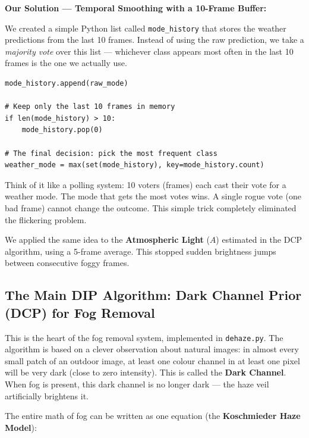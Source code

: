 \documentclass[12pt, a4paper]{article}
\begin{document}
\textbf{Our Solution — Temporal Smoothing with a 10-Frame Buffer:}

We created a simple Python list called \texttt{mode\_history} that stores the
weather predictions from the last 10 frames. Instead of using the raw prediction,
we take a \textit{majority vote} over this list — whichever class appears most
often in the last 10 frames is the one we actually use.

\begin{tcolorbox}[
  colback=blue!5!white,
  colframe=blue!50!black,
  title={\textbf{Temporal Smoothing Logic (main.py, lines 56--61)}},
  arc=4pt
]
\begin{lstlisting}
mode_history.append(raw_mode)

# Keep only the last 10 frames in memory
if len(mode_history) > 10:
    mode_history.pop(0)

# The final decision: pick the most frequent class
weather_mode = max(set(mode_history), key=mode_history.count)
\end{lstlisting}
\end{tcolorbox}

Think of it like a polling system: 10 voters (frames) each cast their vote for
a weather mode. The mode that gets the most votes wins. A single rogue vote
(one bad frame) cannot change the outcome. This simple trick completely
eliminated the flickering problem.

We applied the same idea to the \textbf{Atmospheric Light} ($A$) estimated in
the DCP algorithm, using a 5-frame average. This stopped sudden brightness jumps
between consecutive foggy frames.

\subsection{The Main DIP Algorithm: Dark Channel Prior (DCP) for Fog Removal}
\label{sec:dcp}

This is the heart of the fog removal system, implemented in \texttt{dehaze.py}.
The algorithm is based on a clever observation about natural images: in almost
every small patch of an outdoor image, at least one colour channel in at least
one pixel will be very dark (close to zero intensity). This is called the
\textbf{Dark Channel}. When fog is present, this dark channel is no longer dark
— the haze veil artificially brightens it.

The entire math of fog can be written as one equation (the \textbf{Koschmieder
Haze Model}):
\end{document}
